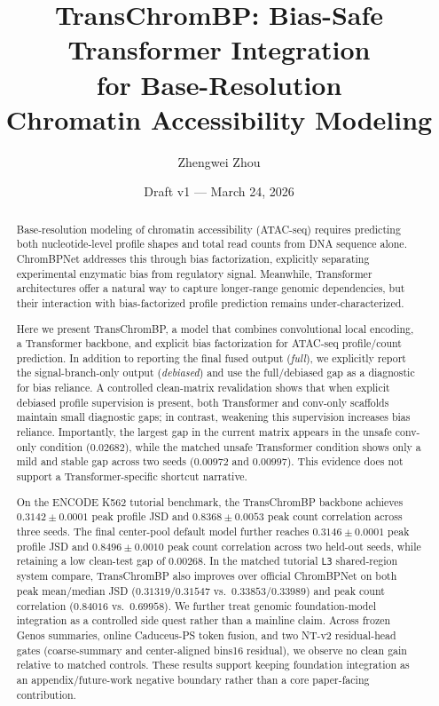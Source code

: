 \documentclass[11pt,a4paper]{article}
\title{TransChromBP: Bias-Safe Transformer Integration \\
for Base-Resolution \\
Chromatin Accessibility Modeling}
\author{Zhengwei Zhou}
\date{Draft v1 --- March 24, 2026}
\begin{document}
\maketitle

\begin{abstract}

Base-resolution modeling of chromatin accessibility (ATAC-seq) requires
predicting both nucleotide-level profile shapes and total read counts
from DNA sequence alone. ChromBPNet addresses this through bias
factorization, explicitly separating experimental enzymatic bias from
regulatory signal. Meanwhile, Transformer architectures offer a natural
way to capture longer-range genomic dependencies, but their interaction
with bias-factorized profile prediction remains under-characterized.

Here we present TransChromBP, a model that combines convolutional local
encoding, a Transformer backbone, and explicit bias factorization for
ATAC-seq profile/count prediction. In addition to reporting the final
fused output (\emph{full}), we explicitly report the signal-branch-only
output (\emph{debiased}) and use the full/debiased gap as a diagnostic
for bias reliance. A controlled clean-matrix revalidation shows that
when explicit debiased profile supervision is present, both Transformer
and conv-only scaffolds maintain small diagnostic gaps; in contrast,
weakening this supervision increases bias reliance. Importantly, the
largest gap in the current matrix appears in the unsafe conv-only
condition (\(0.02682\)), while the matched unsafe Transformer condition
shows only a mild and stable gap across two seeds (\(0.00972\) and
\(0.00997\)). This evidence does not support a Transformer-specific
shortcut narrative.

On the ENCODE K562 tutorial benchmark, the TransChromBP backbone
achieves \(0.3142 \pm 0.0001\) peak profile JSD and
\(0.8368 \pm 0.0053\) peak count correlation across three seeds. The
final center-pool default model further reaches
\(0.3146 \pm 0.0001\) peak profile JSD and
\(0.8496 \pm 0.0010\) peak count correlation across two held-out seeds,
while retaining a low clean-test gap of \(0.00268\). In the matched
tutorial \texttt{L3} shared-region system compare, TransChromBP also improves
over official ChromBPNet on both peak mean/median JSD
(\(0.31319/0.31547\) vs.\ \(0.33853/0.33989\)) and peak count
correlation (\(0.84016\) vs.\ \(0.69958\)). We further treat genomic
foundation-model integration as a controlled side quest rather than a
mainline claim. Across frozen Genos summaries, online Caduceus-PS
token fusion, and two NT-v2 residual-head gates (coarse-summary and
center-aligned bins16 residual), we observe no clean gain relative to
matched controls. These results support keeping foundation integration
as an appendix/future-work negative boundary rather than a core
paper-facing contribution.

\end{abstract}
\end{document}
